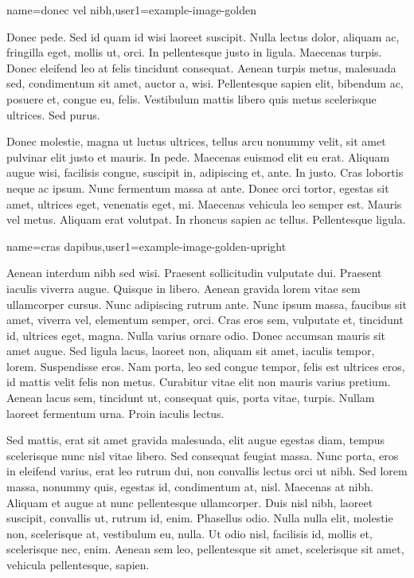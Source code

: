 %
{name={donec vel nibh},user1={example-image-golden}}%
{%
  Donec pede. Sed id quam id wisi laoreet suscipit. Nulla lectus
dolor, aliquam ac, fringilla eget, mollis ut, orci. In pellentesque
justo in ligula. Maecenas turpis. Donec eleifend leo at felis
tincidunt consequat. Aenean turpis metus, malesuada sed, condimentum
sit amet, auctor a, wisi. Pellentesque sapien elit, bibendum ac,
posuere et, congue eu, felis. Vestibulum mattis libero quis metus
scelerisque ultrices. Sed purus.

Donec molestie, magna ut luctus ultrices, tellus arcu nonummy velit,
sit amet pulvinar elit justo et mauris.  In pede.  Maecenas euismod
elit eu erat. Aliquam augue wisi, facilisis congue, suscipit in,
adipiscing et, ante. In justo. Cras lobortis neque ac ipsum. Nunc
fermentum massa at ante. Donec orci tortor, egestas sit amet,
ultrices eget, venenatis eget, mi.  Maecenas vehicula leo semper
est. Mauris vel metus. Aliquam erat volutpat. In rhoncus sapien ac
tellus. Pellentesque ligula.
}

%
{name={cras dapibus},user1={example-image-golden-upright}}%
{%
Aenean interdum nibh sed wisi. Praesent sollicitudin vulputate dui.
Praesent iaculis viverra augue. Quisque in libero. Aenean gravida
lorem vitae sem ullamcorper cursus. Nunc adipiscing rutrum ante.
Nunc ipsum massa, faucibus sit amet, viverra vel, elementum semper,
orci. Cras eros sem, vulputate et, tincidunt id, ultrices eget,
magna. Nulla varius ornare odio. Donec accumsan mauris sit amet
augue. Sed ligula lacus, laoreet non, aliquam sit amet, iaculis
tempor, lorem. Suspendisse eros. Nam porta, leo sed congue tempor,
felis est ultrices eros, id mattis velit felis non metus.  Curabitur
vitae elit non mauris varius pretium. Aenean lacus sem, tincidunt
ut, consequat quis, porta vitae, turpis. Nullam laoreet fermentum
urna. Proin iaculis lectus.

Sed mattis, erat sit amet gravida malesuada, elit augue egestas
diam, tempus scelerisque nunc nisl vitae libero.  Sed consequat
feugiat massa. Nunc porta, eros in eleifend varius, erat leo rutrum
dui, non convallis lectus orci ut nibh. Sed lorem massa, nonummy
quis, egestas id, condimentum at, nisl. Maecenas at nibh.  Aliquam
et augue at nunc pellentesque ullamcorper. Duis nisl nibh, laoreet
suscipit, convallis ut, rutrum id, enim. Phasellus odio.  Nulla
nulla elit, molestie non, scelerisque at, vestibulum eu, nulla. Ut
odio nisl, facilisis id, mollis et, scelerisque nec, enim.  Aenean
sem leo, pellentesque sit amet, scelerisque sit amet, vehicula
pellentesque, sapien.
}

